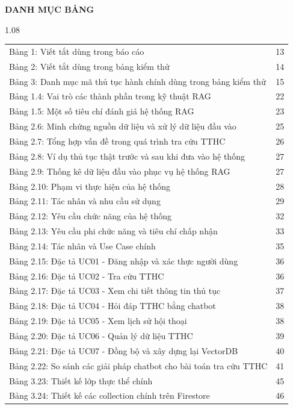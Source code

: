 \begin{center}\Large\bfseries DANH MỤC BẢNG\end{center}
\vspace{0.3cm}
\begin{spacing}{1.08}
\begin{longtable}{@{}p{}r@{}}
Bảng 1: Viết tắt dùng trong báo cáo & 13\\
Bảng 2: Viết tắt dùng trong bảng kiểm thử & 14\\
Bảng 3: Danh mục mã thủ tục hành chính dùng trong bảng kiểm thử & 15\\
Bảng 1.4: Vai trò các thành phần trong kỹ thuật RAG & 22\\
Bảng 1.5: Một số tiêu chí đánh giá hệ thống RAG & 23\\
Bảng 2.6: Minh chứng nguồn dữ liệu và xử lý dữ liệu đầu vào & 25\\
Bảng 2.7: Tổng hợp vấn đề trong quá trình tra cứu TTHC & 26\\
Bảng 2.8: Ví dụ thủ tục thật trước và sau khi đưa vào hệ thống & 27\\
Bảng 2.9: Thống kê dữ liệu đầu vào phục vụ hệ thống RAG & 27\\
Bảng 2.10: Phạm vi thực hiện của hệ thống & 28\\
Bảng 2.11: Tác nhân và nhu cầu sử dụng & 29\\
Bảng 2.12: Yêu cầu chức năng của hệ thống & 32\\
Bảng 2.13: Yêu cầu phi chức năng và tiêu chí chấp nhận & 33\\
Bảng 2.14: Tác nhân và Use Case chính & 35\\
Bảng 2.15: Đặc tả UC01 - Đăng nhập và xác thực người dùng & 36\\
Bảng 2.16: Đặc tả UC02 - Tra cứu TTHC & 36\\
Bảng 2.17: Đặc tả UC03 - Xem chi tiết thông tin thủ tục & 37\\
Bảng 2.18: Đặc tả UC04 - Hỏi đáp TTHC bằng chatbot & 38\\
Bảng 2.19: Đặc tả UC05 - Xem lịch sử hội thoại & 38\\
Bảng 2.20: Đặc tả UC06 - Quản lý dữ liệu TTHC & 39\\
Bảng 2.21: Đặc tả UC07 - Đồng bộ và xây dựng lại VectorDB & 40\\
Bảng 2.22: So sánh các giải pháp chatbot cho bài toán tra cứu TTHC & 41\\
Bảng 3.23: Thiết kế lớp thực thể chính & 45\\
Bảng 3.24: Thiết kế các collection chính trên Firestore & 46\\

\end{longtable}
\end{spacing}
